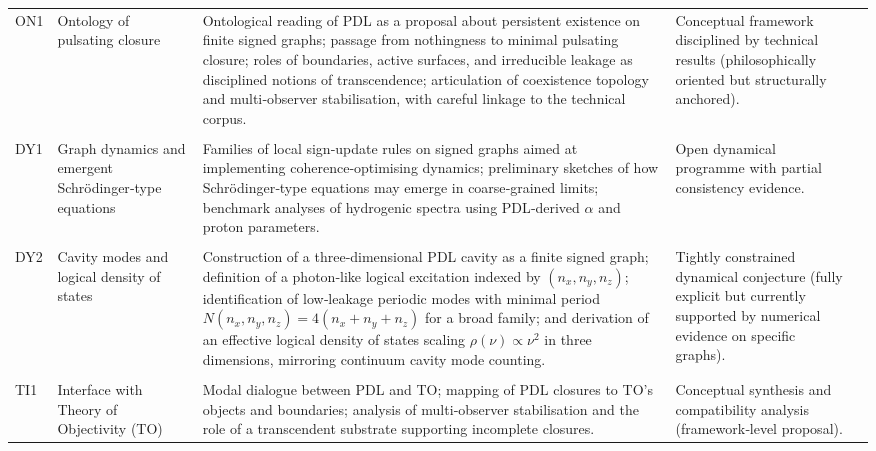 \documentclass[11pt,a4paper]{article}
\begin{document}
\begin{longtable}{L{0.8cm}L{1.9cm}L{5.9cm}L{3cm}L{2.2cm}}
ON1 &
Ontology of pulsating closure &
Ontological reading of PDL as a proposal about persistent existence on finite signed graphs; passage from nothingness to minimal pulsating closure; roles of boundaries, active surfaces, and irreducible leakage as disciplined notions of transcendence; articulation of coexistence topology and multi‑observer stabilisation, with careful linkage to the technical corpus. &
Conceptual framework disciplined by technical results (philosophically oriented but structurally anchored). &
\citep{ExistencePulsatingClosure2026,PDL_Main_2026,PDL_position,PDL_TO_dialogue} \\\\[0.4em]

DY1 &
Graph dynamics and emergent Schr\"odinger‑type equations &
Families of local sign‑update rules on signed graphs aimed at implementing coherence‑optimising dynamics; preliminary sketches of how Schr\"odinger‑type equations may emerge in coarse‑grained limits; benchmark analyses of hydrogenic spectra using PDL‑derived $\alpha$ and proton parameters. &
Open dynamical programme with partial consistency evidence. &
\citep{Effective_Fields_PDL_2026,Schrodinger_Sketch_v2_2026,Schrodinger_PDL_v2_2026,PDL_position} \\\\[0.4em]

DY2 &
Cavity modes and logical density of states &
Construction of a three‑dimensional PDL cavity as a finite signed graph; definition of a photon‑like logical excitation indexed by $(n_x,n_y,n_z)$; identification of low‑leakage periodic modes with minimal period $N(n_x,n_y,n_z)=4(n_x+n_y+n_z)$ for a broad family; and derivation of an effective logical density of states scaling $\rho(\nu)\propto \nu^2$ in three dimensions, mirroring continuum cavity mode counting. &
Tightly constrained dynamical conjecture (fully explicit but currently supported by numerical evidence on specific graphs). &
\citep{PDLCavityModes2026,Effective_Fields_PDL_2026} \\\\[0.4em]

TI1 &
Interface with Theory of Objectivity (TO) &
Modal dialogue between PDL and TO; mapping of PDL closures to TO’s objects and boundaries; analysis of multi‑observer stabilisation and the role of a transcendent substrate supporting incomplete closures. &
Conceptual synthesis and compatibility analysis (framework‑level proposal). &
\citep{PDL_TO_dialogue,PDL_position,ExistencePulsatingClosure2026} \\[0.4em]

\end{longtable}
\end{document}

